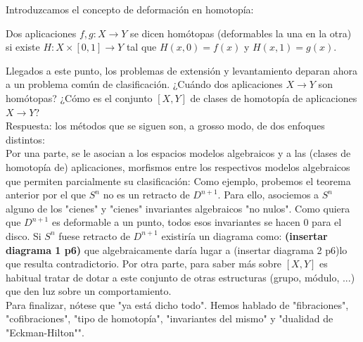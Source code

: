 Introduzcamos el concepto de deformación en homotopía:
\begin{defin}
Dos aplicaciones $f, g : X \rightarrow Y$ se dicen homótopas (deformables la una en la otra) si existe $H : X \times [0,1] \rightarrow Y$ tal que $H(x ,0) = f(x)$ y $H(x, 1) = g(x)$.
\end{defin}
Llegados a este punto, los problemas de extensión y levantamiento deparan ahora a un problema común de clasificación. ¿Cuándo dos aplicaciones $X \rightarrow Y$ son homótopas? ¿Cómo es el conjunto $[X, Y]$ de clases de homotopía de aplicaciones $X \rightarrow Y$?\\
Respuesta: los métodos que se siguen son, a grosso modo, de dos enfoques distintos:\\
Por una parte, se le asocian a los espacios modelos algebraicos y a las (clases de homotopía de) aplicaciones, morfismos entre los respectivos modelos algebraicos que permiten parcialmente su clasificación:
Como ejemplo, probemos el teorema anterior por el que $S^n$ no es un retracto de $D^{n+1}$. Para ello, asociemos a $S^n$ alguno de los "cienes" y "cienes" invariantes algebraicos "no nulos". Como quiera que $D^{n+1}$ es deformable a un punto, todos esos invariantes se hacen 0 para el disco. Si $S^n$ fuese retracto de $D^{n+1}$ existiría un diagrama como: \textbf{(insertar diagrama 1 p6)}
que algebraicamente daría lugar a (insertar diagrama 2 p6)lo que resulta contradictorio.
Por otra parte, para saber más sobre $[X, Y]$ es habitual tratar de dotar a este conjunto de otras estructuras (grupo, módulo, ...) que den luz sobre un comportamiento.\\
Para finalizar, nótese que "ya está dicho todo". Hemos hablado de "fibraciones", "cofibraciones", "tipo de homotopía", "invariantes del mismo" y "dualidad de "Eckman-Hilton"".
